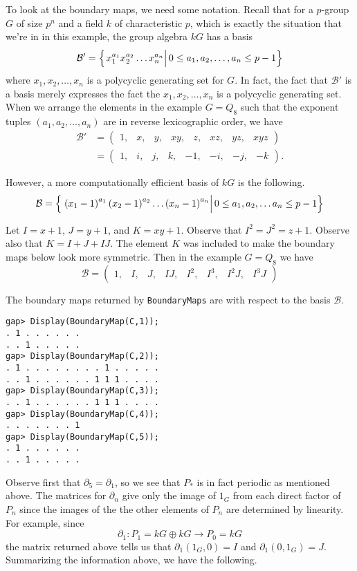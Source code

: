 \documentclass[12pt]{article}
\begin{document}
To look at the boundary maps, we need some notation.
Recall that for a $p$-group $G$ of size $p^n$ and a field $k$ of
characteristic $p$, which is exactly the situation
that we're in in this example, the group algebra $kG$ has a basis
\begin{equation}
\mathcal{B}'=\left\{\left.\rule{0pt}{12pt} x_1^{a_1}x_2^{a_2}\dots x_n^{a_n}\right|
0\le a_1,a_2,\dots,a_n\le p-1\right\}\end{equation}
where $x_1,x_2,\dots,x_n$ is a polycyclic generating set for $G$.
In fact, the fact that $\mathcal{B'}$ is a basis merely expresses the
fact the $x_1,x_2,\dots,x_n$ is a polycyclic generating set.
When we arrange the elements in the example $G=Q_8$
such that the exponent tuples $\left(a_1,a_2,\dots, a_n\right)$
are in reverse lexicographic order, we have
\begin{align*}
\mathcal{B}'
&=\left(\begin{array}{cccccccc}1,&x,&y,&xy,&z,&xz,&yz,&xyz\end{array}\right)\\
&=\left(\begin{array}{cccccccc}1,&i,&j,&k,&-1,&-i,&-j,&-k\end{array}\right).
\end{align*}

However, a more computationally efficient basis of $kG$ is the following.
\begin{equation}
\mathcal{B}=\left\{\left.\rule{0pt}{12pt}\left(x_1-1\right)^{a_1}
\left(x_2-1\right)^{a_2}\dots \left(x_n-1\right)^{a_n}\right|
0\le a_1,a_2,\dots a_n\le p-1\right\}\end{equation}

Let $I=x+1$, $J=y+1$, and $K=xy+1$.
Observe that $I^2=J^2=z+1$.
Observe also that $K=I+J+IJ$. The element $K$ was included
to make the boundary maps below look more symmetric.
Then in the example $G=Q_8$ we have
\[\mathcal{B}=\left(\begin{array}{cccccccc}
1,&I,&J,&IJ,&I^2,&I^3,&I^2J,&I^3J\end{array}\right)\]

The boundary maps returned by \verb!BoundaryMaps! are with respect
to the basis $\mathcal{B}$.
\begin{verbatim}
gap> Display(BoundaryMap(C,1));
. 1 . . . . . .
. . 1 . . . . .
gap> Display(BoundaryMap(C,2));
. 1 . . . . . . . . 1 . . . . .
. . 1 . . . . . . 1 1 1 . . . .
gap> Display(BoundaryMap(C,3));
. . 1 . . . . . . 1 1 1 . . . .
gap> Display(BoundaryMap(C,4));
. . . . . . . 1
gap> Display(BoundaryMap(C,5));
. 1 . . . . . .
. . 1 . . . . .
\end{verbatim}
Observe first that $\partial_5=\partial_1$,
so we see that $P_\ast$ is in fact
periodic as mentioned above. 
The matrices for $\partial_n$ give only the image of $1_G$
from each direct factor of $P_n$ since the images of the
the other elements of $P_n$ are determined by linearity.
For example, since \[\partial_1:P_1=kG\oplus kG\to P_0=kG\]
the matrix returned above tells us that $\partial_1\left(1_G,0\right)=I$
and $\partial_1\left(0,1_G\right)=J$. Summarizing the information
above, we have the following.
\end{document}
